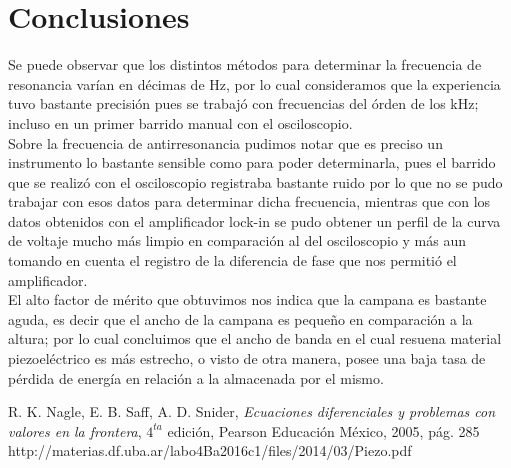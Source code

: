 \documentclass[twoside,twocolumn,a4paper]{article}
\begin{document}

\section{Conclusiones}

Se puede observar que los distintos m\'etodos para determinar la frecuencia de resonancia var\'ian en d\'ecimas de Hz, por lo cual consideramos que la experiencia tuvo bastante precisi\'on pues se trabaj\'o con frecuencias del \'orden de los kHz; incluso en un primer barrido manual con el osciloscopio. \\

Sobre la frecuencia de antirresonancia pudimos notar que es preciso un instrumento lo bastante sensible como para poder determinarla, pues el barrido que se realiz\'o con el osciloscopio registraba bastante ruido por lo que no se pudo trabajar con esos datos para determinar dicha frecuencia, mientras que con los datos obtenidos con el amplificador lock-in se pudo obtener un perfil de la curva de voltaje mucho m\'as limpio en comparaci\'on al del osciloscopio y m\'as aun tomando en cuenta el registro de la diferencia de fase que nos permiti\'o el amplificador. \\

El alto factor de m\'erito que obtuvimos nos indica que la campana es bastante aguda, es decir que el ancho de la campana es peque\~no en comparaci\'on a la altura; por lo cual concluimos que el ancho de banda en el cual resuena material piezoel\'ectrico es m\'as estrecho, o visto de otra manera, posee una baja tasa de p\'erdida de energ\'ia en relaci\'on a la almacenada por el mismo.

\newpage
\begin{thebibliography}{99} %


 R. K. Nagle, E. B. Saff, A. D. Snider, \textit{Ecuaciones diferenciales y problemas con valores en la frontera}, $4^{ta}$ edici\'on, Pearson Educaci\'on M\'exico, 2005, p\'ag. 285
 http://materias.df.uba.ar/labo4Ba2016c1/files/2014/03/Piezo.pdf 
 
\end{thebibliography}


\end{document}
